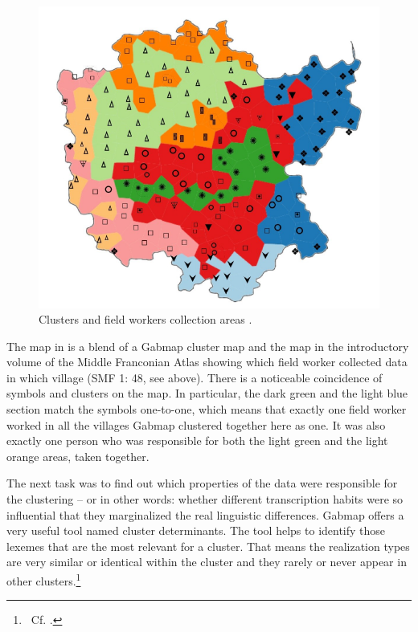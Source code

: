 \documentclass[output=paper]{LSP/langsci}
\begin{document}
\begin{figure}
\includegraphics[width=.7\textwidth]{illustrations/mathus_fig8}
\caption{Clusters and field worker{\textquotesingle}s collection areas \citep[216]{mathussek_sprachraume_2014}.}
\label{fig:8}
\end{figure}

The map in  is a blend of a Gabmap cluster map and the map in the introductory volume of the Middle Franconian Atlas showing which field worker collected data in which village (SMF 1: 48, see  above). There is a noticeable coincidence  of symbols and clusters on the map. In particular, the dark green and the light blue section match the symbols one-to-one, which means that exactly one field worker worked in all the villages Gabmap clustered together here as one. It was also exactly one person who was responsible for both the light green and the light orange areas, taken together.

The next task was to find out which properties of the data were responsible for the clustering – or in other words: whether  different transcription habits were so influential that they marginalized the real linguistic differences. Gabmap offers a very useful tool named cluster determinants. The tool helps to identify those lexemes that are the most relevant for a cluster. That means the realization types are very similar or identical within the cluster and they rarely or never appear in other clusters.\footnote{\ Cf. \citet{nerbonne_gabmap_2011}.}
\end{document}

